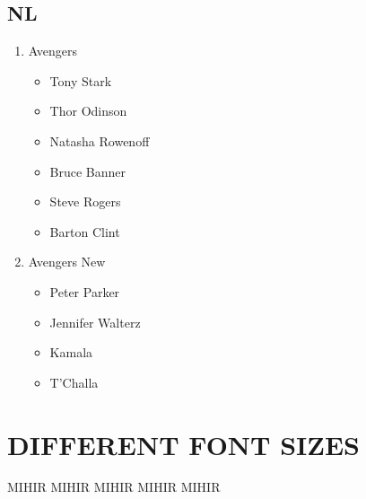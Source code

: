 \documentclass{article}
\begin{document}
	\subsection{NL}
	\begin{enumerate}
		\item Avengers
		\begin{itemize}
			\item Tony Stark
			\item Thor Odinson
			\item Natasha Rowenoff
			\item Bruce Banner
			\item Steve Rogers
			\item Barton Clint
		\end{itemize}
		\item Avengers New
		\begin{itemize}
			\item Peter Parker
			\item Jennifer Walterz
			\item Kamala
			\item T'Challa
		\end{itemize}
	\end{enumerate}
	\pagebreak
	\section{DIFFERENT FONT SIZES}
	\Huge{MIHIR}
	\LARGE{MIHIR}
	\Large{MIHIR}
	\normalsize{MIHIR}
	\small{MIHIR}
\end{document}
